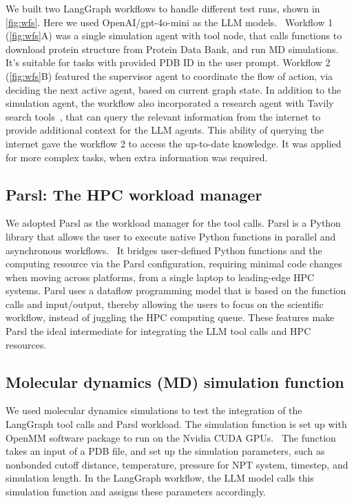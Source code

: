We built two LangGraph workflows to handle different test runs, shown in \autoref{fig:wfs}. 
Here we used OpenAI/gpt-4o-mini as the LLM models.~\cite{gpt4omini_openai}
Workflow 1 (\autoref{fig:wfs}A) was a single simulation agent with tool node, that calls functions to download protein structure from Protein Data Bank, and run MD simulations. 
It's suitable for tasks with provided PDB ID in the user prompt. 
Workflow 2 (\autoref{fig:wfs}B) featured the supervisor agent to coordinate the flow of action, via deciding the next active agent, based on current graph state. 
In addition to the simulation agent, the workflow also incorporated a research agent with Tavily search tools~\cite{tavily_search}, that can query the relevant information from the internet to provide additional context for the LLM agents. 
This ability of querying the internet gave the workflow 2 to access the up-to-date knowledge. 
It was applied for more complex tasks, when extra information was required. 


\subsection{Parsl: The HPC workload manager}
We adopted Parsl as the workload manager for the tool calls. 
Parsl is a Python library that allows the user to execute native Python functions in parallel and asynchronous workflows.~\cite{babuji19parsl, ward2021colmena}
It bridges user-defined Python functions and the computing resource via the Parsl configuration, requiring minimal code changes when moving across platforms, from a single laptop to leading-edge HPC systems. 
Parsl uses a dataflow programming model that is based on the function calls and input/output, thereby allowing the users to focus on the scientific workflow, instead of juggling the HPC computing queue. 
These features make Parsl the ideal intermediate for integrating the LLM tool calls and HPC resources. 

\subsection{Molecular dynamics (MD) simulation function}
We used molecular dynamics simulations to test the integration of the LangGraph tool calls and Parsl workload. 
The simulation function is set up with OpenMM software package to run on the Nvidia CUDA GPUs.~\cite{eastman2023openmm}
The function takes an input of a PDB file, and set up the simulation parameters, such as nonbonded cutoff distance, temperature, pressure for NPT system, timestep, and simulation length. 
In the LangGraph workflow, the LLM model calls this simulation function and assigns these parameters accordingly. 

